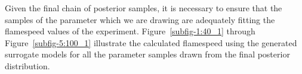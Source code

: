 \bigskip

Given the final chain of posterior samples, it is necessary to ensure that the samples of the parameter which we
 are drawing are adequately fitting the flamespeed values of the experiment.
Figure~\ref{subfig-1:40_1} through
 Figure~\ref{subfig-5:100_1} illustrate the calculated flamespeed
 using the generated surrogate models for all the
 parameter samples drawn from the final posterior distribution.






















